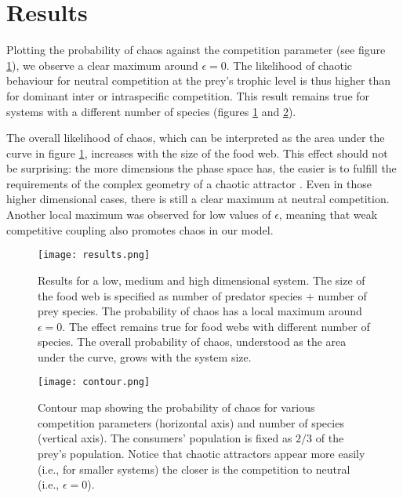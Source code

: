 \section{Results}
\label{sec:Results}
Plotting the probability of chaos against the competition parameter (see figure \ref{fig:Results}), we observe a clear maximum around $ \epsilon = 0 $. The likelihood of chaotic behaviour for neutral competition at the prey's trophic level is thus higher than for dominant inter or intraspecific competition. This result remains true for systems with a different number of species (figures \ref{fig:Results} and \ref{fig:Contour}).

The overall likelihood of chaos, which can be interpreted as the area under the curve in figure \ref{fig:Results}, increases with the size of the food web. This effect should not be surprising: the more dimensions the phase space has, the easier is to fulfill the requirements of the complex geometry of a chaotic attractor \citep{Strogatz1994}. Even in those higher dimensional cases, there is still a clear maximum at neutral competition. Another local maximum was observed for low values of $ \epsilon $, meaning that weak competitive coupling also promotes chaos in our model.

\begin{figure}
	\begin{center}
		\texttt{[image: results.png]}
	\end{center}
	\caption{Results for a low, medium and high dimensional system. The size of the food web is specified as number of predator species + number of prey species. The probability of chaos has a local maximum around $\epsilon = 0$. The effect remains true for food webs with different number of species. The overall probability of chaos, understood as the area under the curve, grows with the system size. }
	\label{fig:Results}
\end{figure}

\begin{figure}
	\begin{center}
		\texttt{[image: contour.png]}
	\end{center}
	\caption{Contour map showing the probability of chaos for various competition parameters (horizontal axis) and number of species (vertical axis). The consumers' population is fixed as $ 2/3 $ of the prey's population. Notice that chaotic attractors appear more easily (i.e., for smaller systems) the closer is the competition to neutral (i.e., $ \epsilon = 0 $).}
	\label{fig:Contour}
\end{figure}

